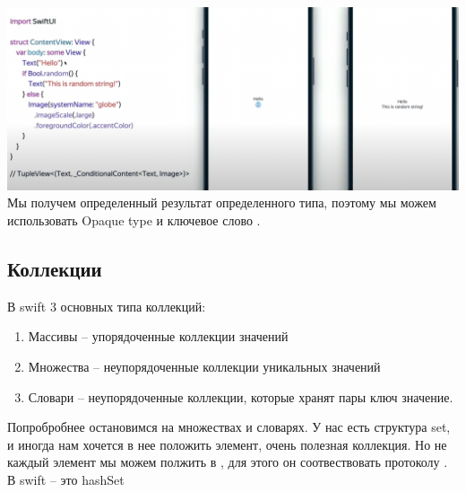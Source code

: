 \documentclass{article}
\begin{document}
    \newline
    \includegraphics[scale = 0.3]{pic/Снимок экрана 2023-07-29 в 00.00.27.png}
    \newline
    Мы получем определенный результат определенного типа, поэтому мы можем использовать Opaque type и ключевое слово .
    \subsection{Коллекции}
    В swift 3 основных типа коллекций: 
    \begin{enumerate}
        \item Массивы -- упорядоченные коллекции значений
        \item Множества -- неупорядоченные коллекции уникальных значений
        \item Словари -- неупорядоченные коллекции, которые хранят пары ключ значение. 
    \end{enumerate}
    Попробробнее остановимся на множествах и словарях. У нас есть структура set, и иногда нам хочется в нее положить элемент, очень полезная коллекция. 
    \newline
    Но не каждый элемент мы можем полжить в , для этого он соотвествовать протоколу . В swift  -- это hashSet
\end{document}
